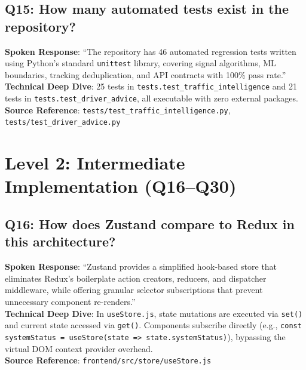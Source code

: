 \subsection*{Q15: How many automated tests exist in the repository?}
\begin{interviewbox}
\textbf{Spoken Response}: ``The repository has 46 automated regression tests written using Python's standard \texttt{unittest} library, covering signal algorithms, ML boundaries, tracking deduplication, and API contracts with 100\% pass rate.''\\
\textbf{Technical Deep Dive}: 25 tests in \texttt{tests.test\_traffic\_intelligence} and 21 tests in \texttt{tests.test\_driver\_advice}, all executable with zero external packages.\\
\textbf{Source Reference}: \texttt{tests/test\_traffic\_intelligence.py}, \texttt{tests/test\_driver\_advice.py}
\end{interviewbox}

\section{Level 2: Intermediate Implementation (Q16--Q30)}

\subsection*{Q16: How does Zustand compare to Redux in this architecture?}
\begin{interviewbox}
\textbf{Spoken Response}: ``Zustand provides a simplified hook-based store that eliminates Redux's boilerplate action creators, reducers, and dispatcher middleware, while offering granular selector subscriptions that prevent unnecessary component re-renders.''\\
\textbf{Technical Deep Dive}: In \texttt{useStore.js}, state mutations are executed via \texttt{set()} and current state accessed via \texttt{get()}. Components subscribe directly (e.g., \texttt{const systemStatus = useStore(state => state.systemStatus)}), bypassing the virtual DOM context provider overhead.\\
\textbf{Source Reference}: \texttt{frontend/src/store/useStore.js}
\end{interviewbox}

